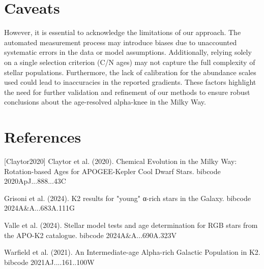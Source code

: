 \documentclass[twocolumn]{aastex631}
\begin{document}
\section{Caveats}
However, it is essential to acknowledge the limitations of our approach. The automated measurement process may introduce biases due to unaccounted systematic errors in the data or model assumptions. Additionally, relying solely on a single selection criterion (C/N ages) may not capture the full complexity of stellar populations. Furthermore, the lack of calibration for the abundance scales used could lead to inaccuracies in the reported gradients. These factors highlight the need for further validation and refinement of our methods to ensure robust conclusions about the age-resolved alpha-knee in the Milky Way.
\section*{References}
\footnotesize
[Claytor2020] Claytor et al. (2020). Chemical Evolution in the Milky Way: Rotation-based Ages for APOGEE-Kepler Cool Dwarf Stars. bibcode 2020ApJ...888...43C \par [Grisoni2024] Grisoni et al. (2024). K2 results for "young" α-rich stars in the Galaxy. bibcode 2024A\&A...683A.111G \par [Valle2024] Valle et al. (2024). Stellar model tests and age determination for RGB stars from the APO-K2 catalogue. bibcode 2024A\&A...690A.323V \par [Warfield2021] Warfield et al. (2021). An Intermediate-age Alpha-rich Galactic Population in K2. bibcode 2021AJ....161..100W
\end{document}
